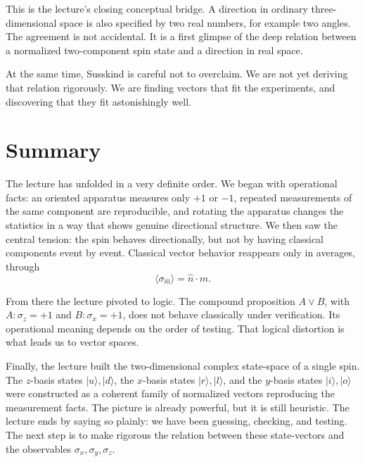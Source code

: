 This is the lecture's closing conceptual bridge. A direction in ordinary three-dimensional space is also specified by two real numbers, for example two angles. The agreement is not accidental. It is a first glimpse of the deep relation between a normalized two-component spin state and a direction in real space.

At the same time, Susskind is careful not to overclaim. We are not yet deriving that relation rigorously. We are finding vectors that fit the experiments, and discovering that they fit astonishingly well.

\section{Summary}

The lecture has unfolded in a very definite order. We began with operational facts: an oriented apparatus measures only \(+1\) or \(-1\), repeated measurements of the same component are reproducible, and rotating the apparatus changes the statistics in a way that shows genuine directional structure. We then saw the central tension: the spin behaves directionally, but not by having classical components event by event. Classical vector behavior reappears only in averages, through
\[
\langle \sigma_{\hat m}\rangle=\hat n\cdot\hat m.
\]

From there the lecture pivoted to logic. The compound proposition \(A\lor B\), with \(A:\sigma_z=+1\) and \(B:\sigma_x=+1\), does not behave classically under verification. Its operational meaning depends on the order of testing. That logical distortion is what leads us to vector spaces.

Finally, the lecture built the two-dimensional complex state-space of a single spin. The \(z\)-basis states \(|u\rangle,|d\rangle\), the \(x\)-basis states \(|r\rangle,|l\rangle\), and the \(y\)-basis states \(|i\rangle,|o\rangle\) were constructed as a coherent family of normalized vectors reproducing the measurement facts. The picture is already powerful, but it is still heuristic. The lecture ends by saying so plainly: we have been guessing, checking, and testing. The next step is to make rigorous the relation between these state-vectors and the observables \(\sigma_x,\sigma_y,\sigma_z\).